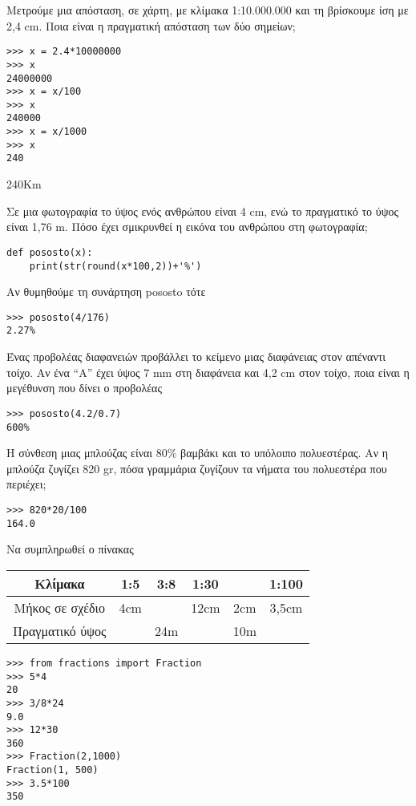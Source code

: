 \begin{exercise}
Μετρούμε μια απόσταση, σε χάρτη, με κλίμακα 1:10.000.000 και τη βρίσκουμε
ίση με 2,4 cm. Ποια είναι η πραγματική απόσταση των δύο σημείων;
\end{exercise}
\begin{lstlisting}
>>> x = 2.4*10000000
>>> x
24000000
>>> x = x/100
>>> x
240000
>>> x = x/1000
>>> x
240
\end{lstlisting}
240Km
\begin{exercise}
Σε μια φωτογραφία το ύψος ενός ανθρώπου είναι 4 cm, ενώ το
πραγματικό το ύψος είναι 1,76 m. Πόσο έχει σμικρυνθεί η εικόνα του
ανθρώπου στη φωτογραφία;
\end{exercise}
\begin{lstlisting}
def pososto(x):
    print(str(round(x*100,2))+'%')
\end{lstlisting}
Αν θυμηθούμε τη συνάρτηση pososto τότε
\begin{lstlisting}
>>> pososto(4/176)
2.27%
\end{lstlisting}
\begin{exercise}
Ένας προβολέας διαφανειών προβάλλει το κείμενο μιας διαφάνειας στον απέναντι
τοίχο. Αν ένα ``A'' έχει ύψος 7 mm στη διαφάνεια και 4,2 cm στον τοίχο, ποια είναι η
μεγέθυνση που δίνει ο προβολέας
\end{exercise}
\begin{lstlisting}
>>> pososto(4.2/0.7)
600%
\end{lstlisting}
\begin{exercise}
Η σύνθεση μιας μπλούζας είναι 80\% βαμβάκι και το υπόλοιπο πολυεστέρας. Aν η μπλούζα
ζυγίζει 820 gr, πόσα γραμμάρια ζυγίζουν τα νήματα του πολυεστέρα που περιέχει;
\end{exercise}
\begin{lstlisting}
>>> 820*20/100
164.0
\end{lstlisting}
\begin{exercise}
Να συμπληρωθεί ο πίνακας
\begin{table}
\begin{tabular}{|c|c|c|c|c|c|}
\hline
Κλίμακα&1:5&3:8&1:30&&1:100\\\hline
Μήκος σε σχέδιο&4cm &&12cm&2cm&3,5cm\\\hline
Πραγματικό ύψος&&24m&&10m&\\\hline
\end{tabular}
\end{table}
\end{exercise}
\begin{lstlisting}
>>> from fractions import Fraction
>>> 5*4
20
>>> 3/8*24
9.0
>>> 12*30
360
>>> Fraction(2,1000)
Fraction(1, 500)
>>> 3.5*100
350
\end{lstlisting}
